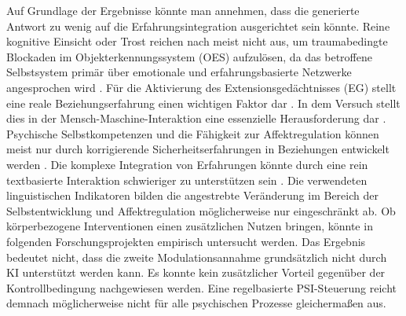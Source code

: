 Auf Grundlage der Ergebnisse könnte man annehmen, dass die generierte Antwort zu wenig auf die Erfahrungsintegration ausgerichtet sein könnte. Reine kognitive Einsicht oder Trost reichen nach \cite{kuhl2005neue} meist nicht aus, um traumabedingte Blockaden im Objekterkennungssystem (OES) aufzulösen, da das betroffene Selbstsystem primär über emotionale und erfahrungsbasierte Netzwerke angesprochen wird \citep{storch2007ressourcenorientiertes}. Für die Aktivierung des Extensionsgedächtnisses (EG) stellt eine reale Beziehungserfahrung einen wichtigen Faktor dar \citep{kuhl2014psi}. In dem Versuch stellt dies in der Mensch-Maschine-Interaktion eine essenzielle Herausforderung dar \citep{mai2020ai}. 
Psychische Selbstkompetenzen und die Fähigkeit zur Affektregulation können meist nur durch korrigierende Sicherheitserfahrungen in Beziehungen entwickelt werden \citep{Levine2010,kuhl2014psi}. Die komplexe Integration von Erfahrungen könnte durch eine rein textbasierte Interaktion schwieriger zu unterstützen sein \citep{mai2020ai}. Die verwendeten linguistischen Indikatoren bilden die angestrebte Veränderung im Bereich der Selbstentwicklung und Affektregulation möglicherweise nur eingeschränkt ab. Ob körperbezogene Interventionen einen zusätzlichen Nutzen bringen, könnte in folgenden Forschungsprojekten empirisch untersucht werden.
Das Ergebnis bedeutet nicht, dass die zweite Modulationsannahme grundsätzlich nicht durch KI unterstützt werden kann. Es konnte kein zusätzlicher Vorteil gegenüber der Kontrollbedingung nachgewiesen werden. Eine regelbasierte PSI-Steuerung reicht demnach möglicherweise nicht für alle psychischen Prozesse gleichermaßen aus.

